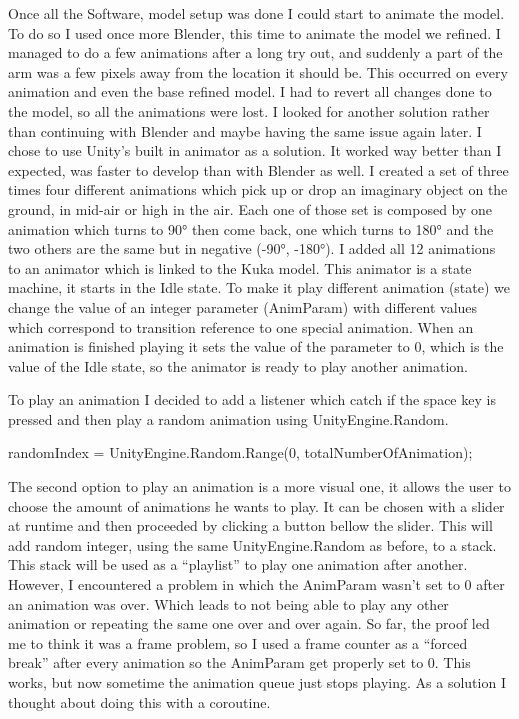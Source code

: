 \documentclass{scrartcl}
\begin{document}
Once all the Software, model setup was done I could start to animate the model. To do so I used once more Blender, 
this time to animate the model we refined. I managed to do a few animations after a long try out, 
and suddenly a part of the arm was a few pixels away from the location it should be. This occurred on every animation and even the base refined model. 
I had to revert all changes done to the model, so all the animations were lost. I looked for another solution rather than continuing with Blender 
and maybe having the same issue again later. I chose to use Unity’s built in animator as a solution. 
It worked way better than I expected, was faster to develop than with Blender as well. I created a set of three times four different animations 
which pick up or drop an imaginary object on the ground, in mid-air or high in the air. 
Each one of those set is composed by one animation which turns to 90° then come back, one which turns to 180° and the two others are the same but in negative (-90°, -180°). 
I added all 12 animations to an animator which is linked to the Kuka model. This animator is a state machine, it starts in the Idle state. 
To make it play different animation (state) we change the value of an integer parameter (AnimParam) with different values 
which correspond to transition reference to one special animation. When an animation is finished playing it sets the value of the parameter to 0, 
which is the value of the Idle state, so the animator is ready to play another animation. 

To play an animation I decided to add a listener which catch if the space key is pressed and then play a random animation using UnityEngine.Random.
\begin{center}
  randomIndex = UnityEngine.Random.Range(0, totalNumberOfAnimation); 
\end{center}

The second option to play an animation is a more visual one, it allows the user to choose the amount of animations he wants to play. 
It can be chosen with a slider at runtime and then proceeded by clicking a button bellow the slider. 
This will add random integer, using the same UnityEngine.Random as before, to a stack. This stack will be used as a “playlist” to play one animation after another. 
However, I encountered a problem in which the AnimParam wasn’t set to 0 after an animation was over. 
Which leads to not being able to play any other animation or repeating the same one over and over again. 
So far, the proof led me to think it was a frame problem, so I used a frame counter as a “forced break” after every animation so the AnimParam get properly set to 0. 
This works, but now sometime the animation queue just stops playing. As a solution I thought about doing this with a coroutine.
\end{document}
